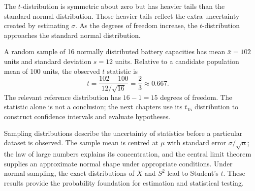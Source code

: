 The $t$-distribution is symmetric about zero but has heavier tails than the standard normal distribution. Those heavier tails reflect the extra uncertainty created by estimating $\sigma$. As the degrees of freedom increase, the $t$-distribution approaches the standard normal distribution.

\begin{example}\par
A random sample of 16 normally distributed battery capacities has mean $\bar x=102$ units and standard deviation $s=12$ units. Relative to a candidate population mean of 100 units, the observed $t$ statistic is
\[
    t=\frac{102-100}{12/\sqrt{16}}
      =\frac{2}{3}
      \approx0.667.
\]
The relevant reference distribution has $16-1=15$ degrees of freedom. The statistic alone is not a conclusion; the next chapters use its $t_{15}$ distribution to construct confidence intervals and evaluate hypotheses.
\end{example}

Sampling distributions describe the uncertainty of statistics before a particular dataset is observed. The sample mean is centred at $\mu$ with standard error $\sigma/\sqrt n$; the law of large numbers explains its concentration, and the central limit theorem supplies an approximate normal shape under appropriate conditions. Under normal sampling, the exact distributions of $\bar X$ and $S^2$ lead to Student's $t$. These results provide the probability foundation for estimation and statistical testing.
